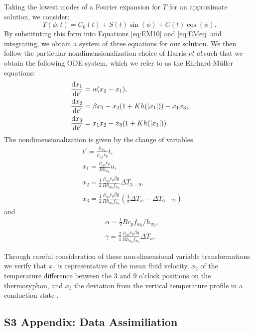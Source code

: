 \documentclass[10pt,letterpaper]{article}
\newcommand{\etal}{\textit{et al.}}
\newcommand{\diff}[2]{\frac{{\rm d}#1}{{\rm d}#2}}
\newcommand{\rhoref}{\rho_{\text{ref}}}
\begin{document}
Taking the lowest modes of a Fourier expansion for $T$ for an approximate solution, we consider:
\begin{equation} T(\phi , t) = C_0 (t) + S(t) \sin (\phi ) + C(t) \cos (\phi) . \end{equation}
By substituting this form into Equations \ref{eq:EM10} and \ref{eq:EMeq} and integrating, we obtain a system of three equations for our solution.
We then follow the particular nondimensionalization choice of Harris \etal such that we obtain the following ODE system, which we refer to as the Ehrhard-M\"{u}ller equations:
\begin{align}
& \diff{x_1}{t'} = \alpha (x_2 - x_1),\\
& \diff{x_2}{t'} = \beta x_1 - x_2 (1 + Kh(|x_1|)) - x_1x_3,\\
& \diff{x_3}{t'} = x_1x_2 - x_3 (1 + Kh(|x_1|)) .\end{align}
The nondimensionalization is given by the change of variables
\begin{align}
& t' = \frac{h_{w_0}}{\rhoref c_p}t,\\
& x_1 = \frac{\rhoref c_p }{R h_{w_0}} u, \\
& x_2 = \frac{1}{2} \frac{\rhoref c_p \beta g}{ R h_{w_0} f_{w_0}} \Delta T_{3-9}, \\
& x_3 = \frac{1}{2} \frac{\rhoref c_p \beta g}{ R h_{w_0} f_{w_0}} \left ( \frac{4}{\pi} \Delta T_w - \Delta T_{6-12} \right ) 
\end{align}
and
\begin{align}
& \alpha = \frac{1}{2} R c_p f_{w_0} / h_{w_0} ,\\
& \gamma = \frac{2}{\pi} \frac{\rhoref c_p \beta g}{Rh_{w_0} f_{w_0}} \Delta T_w. \end{align}

Through careful consideration of these non-dimensional variable transformations we verify that $x_1$ is representative of the mean fluid velocity, $x_2$ of the temperature difference between the 3 and 9 o'clock positions on the thermosyphon, and $x_3$ the deviation from the vertical temperature profile in a conduction state \cite{harris2011predicting}.

\clearpage
\pagebreak
\subsection*{S3 Appendix: Data Assimiliation}
\label{S3}
\end{document}

